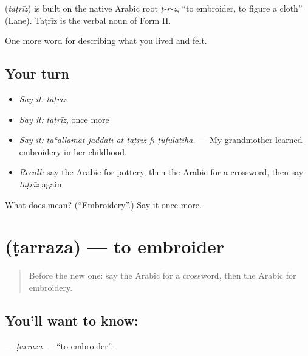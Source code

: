 \begin{cousinweb}
\textbf{} (\emph{taṭrīz}) is built on the native Arabic root \emph{ṭ-r-z}, \textquotedblleft{}to embroider, to figure a cloth\textquotedblright{} (Lane). Taṭrīz is the verbal noun of Form II.
\end{cousinweb}

\begin{grammarlens}[title={What you've built}]
One more word for describing what you lived and felt.
\end{grammarlens}

\subsection*{Your turn}
\begin{itemize}
\raggedright
  \item \emph{Say it:} \emph{taṭrīz}
  \item \emph{Say it:} \emph{taṭrīz}, once more
  \item \emph{Say it:} \emph{taʿallamat jaddatī at-taṭrīz fī ṭufūlatihā.} — My grandmother learned embroidery in her childhood.
  \item \emph{Recall:} say the Arabic for pottery, then the Arabic for a crossword, then say \emph{taṭrīz} again
\end{itemize}

\begin{tcolorbox}[breakable,colback=teal!4,colframe=teal!35!black,title={Before you move on}]
What does  mean? (\textquotedblleft{}Embroidery\textquotedblright{}.) Say it once more.
\end{tcolorbox}
\section[\texorpdfstring{\ar{طرز} (ṭarraza)}{طرز (ṭarraza)}]{ (ṭarraza) — to embroider}

\label{lesson:AR-C538-tarraza}



\begin{quote}
Before the new one: say the Arabic for a crossword, then the Arabic for embroidery.
\end{quote}

\subsection*{You'll want to know: }
\textbf{} — \emph{ṭarraza} — \textquotedblleft{}to embroider\textquotedblright{}.

